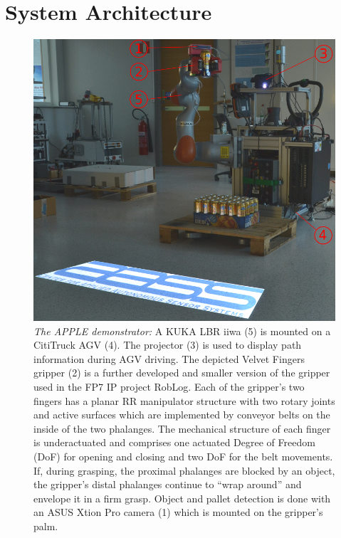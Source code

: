 \section{System Architecture}
\label{sec:arch}
%
\begin{figure}[t!]
\begin{center}
\includegraphics[width =1\linewidth]{figs/apple_demonstrator}
\caption{\textit{The APPLE demonstrator:} A KUKA LBR iiwa (5) is mounted on a CitiTruck AGV (4). The
  projector (3) is used to display path information during AGV driving. The depicted Velvet Fingers
  gripper (2) is a further developed and smaller version of the gripper used in the FP7 IP project
  RobLog. Each of the gripper’s two fingers has a planar RR manipulator structure with two rotary
  joints and active surfaces which are implemented by conveyor belts on the inside of the two
  phalanges. The mechanical structure of each finger is underactuated and comprises one actuated
  Degree of Freedom (DoF) for opening and closing and two DoF for the belt movements. If, during
  grasping, the proximal phalanges are blocked by an object, the gripper’s distal phalanges continue
  to “wrap around” and envelope it in a firm grasp. Object and pallet detection is done with
  an ASUS Xtion Pro camera (1) which is mounted on the gripper's palm.}
\label{fig:robot}
\end{center}
\end{figure}
%
